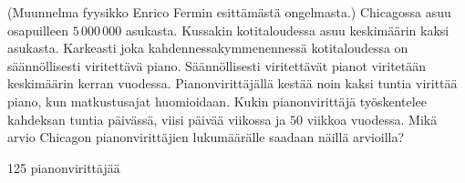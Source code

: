 \begin{tehtavasivu}
\begin{tehtava}
(Muunnelma fyysikko Enrico Fermin esittämästä ongelmasta.) Chicagossa asuu osapuilleen
$5\,000\,000$ asukasta. Kussakin kotitaloudessa asuu keskimäärin kaksi asukasta.
Karkeasti joka kahdennessakymmenennessä kotitaloudessa on säännöllisesti viritettävä piano.
Säännöllisesti viritettävät pianot viritetään keskimäärin kerran vuodessa.
Pianonvirittäjällä kestää noin kaksi tuntia virittää piano, kun matkustusajat huomioidaan.
Kukin pianonvirittäjä työskentelee kahdeksan tuntia päivässä, viisi päivää viikossa
ja $50$ viikkoa vuodessa. Mikä arvio Chicagon pianonvirittäjien lukumäärälle saadaan näillä
arvioilla?
\begin{vastaus}
125 pianonvirittäjää
\end{vastaus}
\end{tehtava}

\end{tehtavasivu}
